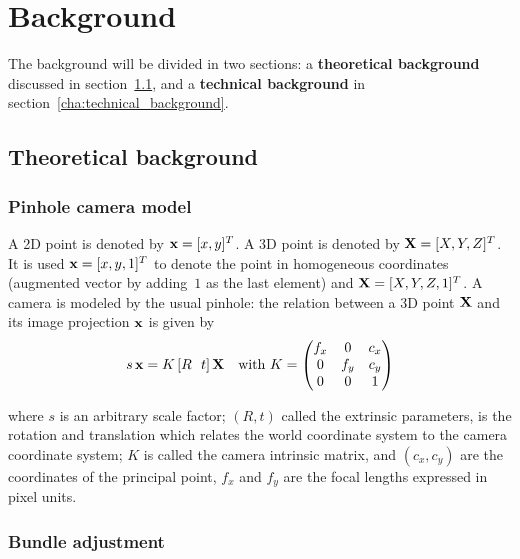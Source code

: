 \chapter{Background}
\label{cha:background}

The background will be divided in two sections: a \textbf{theoretical background} discussed in section~\ref{sec:theoretical_background}, and a \textbf{technical background} in section~\ref{cha:technical_background}.

\section{Theoretical background}
\label{sec:theoretical_background}


\subsection{Pinhole camera model}

A 2D point is denoted by $\mathbf{x} = [x,y]^T$. A 3D point is denoted by $\mathbf{X} = [X,Y,Z]^T$. It is used $\mathbf{x} = [x,y,1]^T$ to denote the point in homogeneous coordinates (augmented vector by adding~$1$ as the last element) and $\mathbf{X} = [X,Y,Z,1]^T$. A camera is modeled by the usual pinhole: the relation between a 3D point $\mathbf{X}$ and its image projection $\mathbf{x}$ is given by
\begin{equation} \label{eq:pinhole}
  s\,\mathbf{x} = K\, [R ~~ t]\,\mathbf{X} \quad \mbox{with } K =
    \begin{pmatrix}
      f_x & 0   & c_x \\
      0   & f_y & c_y \\
      0   & 0   & 1
\end{pmatrix}
\end{equation}

\noindent
where $s$ is an arbitrary scale factor; $(R,t)$ called the extrinsic parameters, is the rotation and translation which relates the world coordinate system to the camera coordinate system; $K$ is called the camera intrinsic matrix, and $(c_x,c_y)$ are the coordinates of the principal point, $f_x$ and $f_y$ are the focal lengths expressed in pixel units.




\subsection{Bundle adjustment}
\label{sec:BA}

